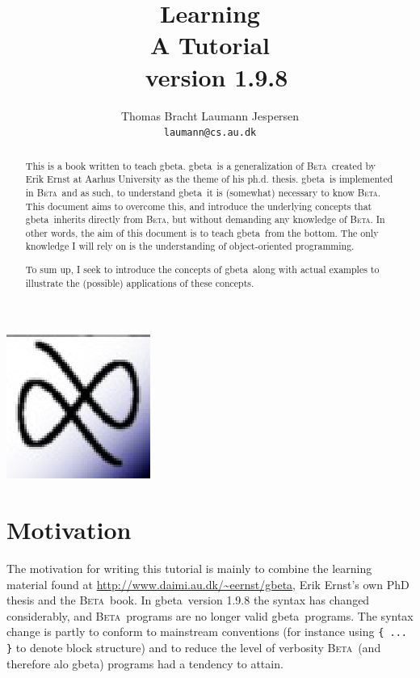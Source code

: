 \documentclass[openany]{memoir}
\author{Thomas Bracht Laumann Jespersen\\ \texttt{laumann@cs.au.dk}}
\title{Learning \gbeta\\A Tutorial\\\normalsize \gbeta\ version 1.9.8}
\newcommand{\gbeta}{\textsf{gbeta}}
\renewcommand{\beta}{\textsc{Beta}}
\begin{document}
\frontmatter

\maketitle

\begin{center}
  \includegraphics[scale=0.5]{pics/logo.eps}
\end{center}

\begin{abstract}
  This is a book written to teach \gbeta . \gbeta\ is a generalization
  of \beta\ created by Erik Ernst at Aarhus University as the theme of
  his ph.d. thesis. \gbeta\ is implemented in \beta\ and as such, to
  understand \gbeta\ it is (somewhat) necessary to know \beta . This
  document aims to overcome this, and introduce the underlying
  concepts that \gbeta\ inherits directly from \beta , but without
  demanding any knowledge of \beta . In other words, the aim of this
  document is to teach \gbeta\ from the bottom. The only knowledge I
  will rely on is the understanding of object-oriented
  programming.

  To sum up, I seek to introduce the concepts of \gbeta\ along with
  actual examples to illustrate the (possible) applications of these
  concepts.

\end{abstract}

\newpage

\tableofcontents

\chapter{Motivation}

The motivation for writing this tutorial is mainly to combine the
learning material found at \url{http://www.daimi.au.dk/~eernst/gbeta},
Erik Ernst's own PhD thesis \cite{ernst99b} and the \beta\ book. In \gbeta\ version
1.9.8 the syntax has changed considerably, and \beta\ programs are
no longer valid \gbeta\ programs. The syntax change is partly to
conform to mainstream conventions (for instance using \verb|{ ... }| to denote
block structure) and to reduce the level of verbosity \beta\ (and
therefore alo \gbeta ) programs had a tendency to attain.
\end{document}
